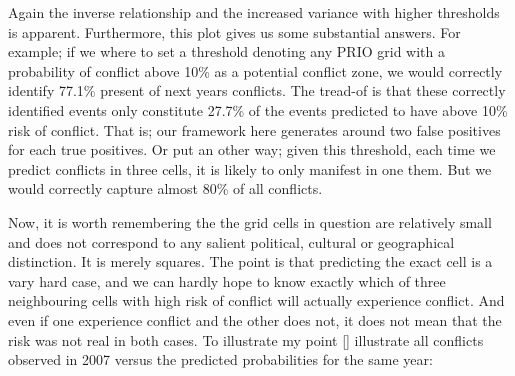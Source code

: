 \documentclass[a4paper]{article}
\begin{document}
Again the inverse relationship and the increased variance with higher thresholds is apparent. Furthermore, this plot gives us some substantial answers. For example; if we where to set a threshold denoting any PRIO grid with a probability of conflict above 10\% as a potential conflict zone, we would correctly identify 77.1\% present of next years conflicts. The tread-of is that these correctly identified events only constitute 27.7\% of the events predicted to have above 10\% risk of conflict. That is; our framework here generates around two false positives for each true positives. Or put an other way; given this threshold, each time we predict conflicts in three cells, it is likely to only manifest in one them. But we would correctly capture almost 80\% of all conflicts.\par

Now, it is worth remembering the the grid cells in question are relatively small and does not correspond to any salient political, cultural or geographical distinction. It is merely squares. The point is that predicting the exact cell is a vary hard case, and we can hardly hope to know exactly which of three neighbouring cells with high risk of conflict will actually experience conflict. And even if one experience conflict and the other does not, it does not mean that the risk was not real in both cases. To illustrate my point \autoref{} illustrate all conflicts observed in 2007 versus the predicted probabilities for the same year:\par
\end{document}
